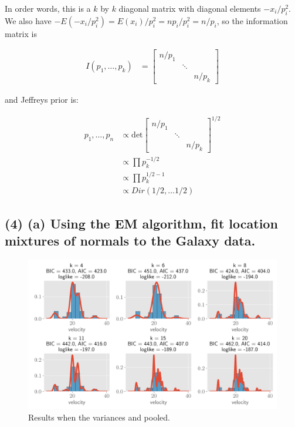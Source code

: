 \documentclass[11pt]{article}
\begin{document}
In order words, this is a $k$ by $k$ diagonal matrix with diagonal elements $ -x_i/p_i^2$. We also have $-E(-x_i/p_i^2)  = E(x_i)/p_i^2 = n p_i/p_i^2 = n/p_i$, so the information matrix is

\begin{align*}
    I(p_1, \dots, p_k) &=  \begin{bmatrix}
    n/p_1 & & \\
    & \ddots & \\
    & & n/p_k
  \end{bmatrix}
\end{align*}

and Jeffreys prior is:

\begin{align*}
    p_1, 
    \ldots, p_n&\propto \text{det}\begin{bmatrix}
    n/p_1 & & \\
    & \ddots & \\
    & & n/p_k
  \end{bmatrix}^{1/2}\\
  &\propto \prod p_k^{-1/2}\\
  &\propto \prod p_k^{1/2-1}\\
  &\propto Dir(1/2, \dots 1/2)
\end{align*}

\subsection*{(4) (a) Using the EM algorithm, fit location mixtures of normals to the Galaxy data.}

\begin{figure}[!h]
    \centering
    \includegraphics[scale=.6
    ]{homework_4/figures/galaxies_1.png}
    \caption{Results when the variances and pooled.}
    \label{fig:my_label}
\end{figure}
\newpage
\end{document}

